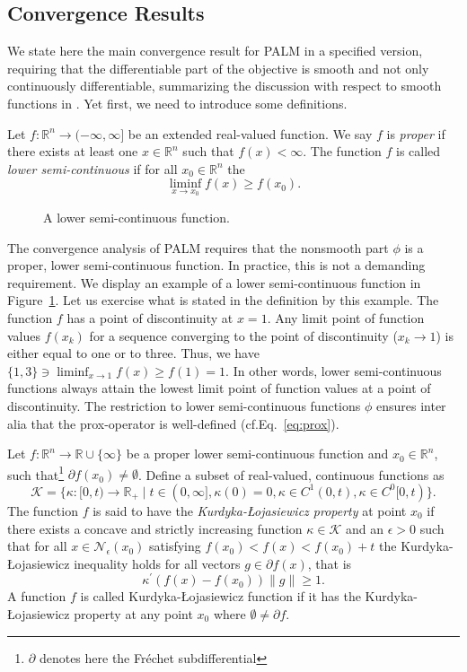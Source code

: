 \subsection{Convergence Results}
We state here the main convergence result for PALM in a specified version, requiring that the differentiable part of the objective is smooth and not only continuously differentiable, summarizing the discussion with respect to smooth functions in \citep{bolte2014proximal}. Yet first, we need to introduce some definitions.
\begin{definition} Let $f:\mathbb{R}^{n}\rightarrow (-\infty,\infty]$ be an extended real-valued function. We say $f$ is \emph{proper} if there exists at least one $x\in\mathbb{R}^n$ such that $f(x)<\infty$. The function $f$ is called \emph{lower semi-continuous} if for all $x_0\in\mathbb{R}^n$ the
\[\liminf_{x\rightarrow x_0}f(x)\geq f(x_0).\]
\end{definition}
\begin{figure}
\centering

\caption{A lower semi-continuous function.}
\label{fig:PT:lowerSemiCont}
\end{figure}
The convergence analysis of PALM requires that the nonsmooth part $\phi$ is a proper, lower semi-continuous function. In practice, this is not a demanding requirement.
We display an example of a lower semi-continuous function in Figure~\ref{fig:PT:lowerSemiCont}. Let us exercise what is stated in the definition by this example. The function $f$ has a point of discontinuity at $x=1$. Any limit point of function values $f(x_k)$ for a sequence converging to the point of discontinuity ($x_k\rightarrow 1$) is either equal to one or to three. Thus, we have $\{1,3\}\ni\liminf_{x\rightarrow 1}f(x)\geq f(1)=1$. In other words, lower semi-continuous functions always attain the lowest limit point of function values at a point of discontinuity. The restriction to lower semi-continuous functions $\phi$ ensures inter alia that the prox-operator is well-defined (cf.\@ Eq.~\eqref{eq:prox}).
\begin{definition}
Let $f:\mathbb{R}^{n}\rightarrow \mathbb{R}\cup\{\infty\}$ be a proper lower semi-continuous function and $x_0\in\mathbb{R}^n$, such that\footnote{$\partial $ denotes here the Fr\'{e}chet subdifferential} $\partial f(x_0)\neq\emptyset$. Define a subset of real-valued, continuous functions as
\[\mathcal{K}=\{\kappa:[0,t)\rightarrow \mathbb{R}_+\mid t\in(0,\infty],\kappa(0)=0,\kappa\in C^1(0,t), \kappa\in C^0[0,t)\}.\] 
The function $f$ is said to have the \emph{Kurdyka-{\L}ojasiewicz property} at point $x_0$ if there exists a concave and strictly increasing function $\kappa\in\mathcal{K}$ and an $\epsilon>0$ such that for all 
$x\in \mathcal{N}_\epsilon(x_0)$ satisfying $f(x_0)<f(x)<f(x_0)+t$
the Kurdyka-{\L}ojasiewicz inequality holds for all vectors $g\in\partial f(x)$, that is
\[\kappa^\prime\left(f(x)-f(x_0)\right)\|g\|\geq 1.\]
A function $f$ is called Kurdyka-{\L}ojasiewicz function if it has the Kurdyka-{\L}ojasiewicz property at any point $x_0$ where $\emptyset \neq \partial f$. 
\end{definition}
